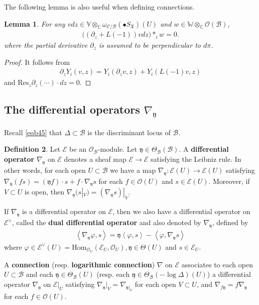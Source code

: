 \documentclass[11pt,b5paper,notitlepage]{article}
\theoremstyle{definition}
\newtheorem{df}{Definition}[section]
\theoremstyle{plain}
\newtheorem{lm}[df]{Lemma}
\newcommand{\mc}{\mathcal}
\newcommand{\Hom}{\mathrm{Hom}}
\newcommand{\Res}{\mathrm{Res}}
\newcommand{\scr}{\mathscr}
\newcommand{\yk}{\mathfrak y}
\newcommand{\blt}{\bullet}
\newcommand{\Vbb}{\mathbb V}
\newcommand{\Wbb}{\mathbb W}
\newcommand{\Cbb}{\mathbb C}
\newcommand{\<}{\left\langle}
\renewcommand{\>}{\right\rangle}
\newcommand{\MO}{\mathcal{O}}
\newcommand{\MC}{\mathcal{C}}
\newcommand{\MB}{\mathcal{B}}
\newcommand{\fx}{\mathfrak{X}}
\numberwithin{equation}{section}
\begin{document}
The following lemma is also useful when defining connections.
\begin{lm}\label{commutator777}
    For any $vdz\in \Vbb\otimes_\Cbb \omega_{\MC/\MB}(\blt S_\fx)(U)$ and $w\in \Wbb\otimes_\Cbb \MO(\MB)$, 
    \begin{align}
        \big((\partial_z+L(-1)) vdz\big)*_i w=0.
    \end{align}
where the partial derivative $\partial_z$ is assumed to be perpendicular to $d\pi$.
\end{lm}
\begin{proof}
    It follows from
    \begin{align*}
        \partial_z Y_i(v,z)=Y_i(\partial_z v,z)+Y_i(L(-1)v,z)
    \end{align*}
    and $\Res_z \partial_z(\cdots)\cdot dz=0$.
\end{proof}

\subsection{The differential operators $\nabla_\yk$}\label{lbb17}

Recall \eqref{eqb45} that $\Delta\subset\mc B$ is the discriminant locus of $\mc B$.

\begin{df}\label{lbb18}
Let $\scr E$ be an $\mc O_\MB$-module. Let $\yk\in\Theta_\MB(\mc B)$. A \textbf{differential operator} $\nabla_\yk$ on $\scr E$ denotes a sheaf map $\scr E\rightarrow\scr E$ satisfying the Leibniz rule. In other words, for each open $U\subset\mc B$ we have a map $\nabla_\yk:\scr E(U)\rightarrow\scr E(U)$ satisfying $\nabla_\yk(fs)=(\yk f)\cdot s+f\cdot \nabla_\yk s$ for each $f\in\mc O(U)$ and $s\in\scr E(U)$. Moreover, if $V\subset U$ is open, then $\nabla_\yk(s|_V)=(\nabla_\yk s)|_V$.

If $\nabla_\yk$ is a differential operator on $\scr E$, then we also have a differential operator on $\scr E^\vee$, called the \textbf{dual differential operator} and also denoted by $\nabla_\yk$, defined by
    \begin{align}\label{notation1}
        \<\nabla_\yk \varphi,s\>=\yk\<\varphi,s\>-\<\varphi,\nabla_\yk s\>
    \end{align}
    where $\varphi\in \scr E^\vee(U)=\Hom_{\MO_U}(\scr E_U,\MO_U),\yk\in \Theta(U)$ and $s\in \scr E_U$.  


A \textbf{connection} (resp. \textbf{logarithmic connection}) $\nabla$ on $\scr E$ associates to each open $U\subset\mc B$ and each $\yk\in\Theta_\MB(U)$ (resp. each $\yk\in\Theta_\MB(-\log\Delta)(U)$) a differential operator $\nabla_\yk$ on $\scr E|_U$ satisfying $\nabla_\yk|_V=\nabla_{\yk|_V}$ for each open $V\subset U$, and $\nabla_{f\yk}=f\nabla_\yk$ for each $f\in\mc O(U)$. \hfill\qedsymbol
\end{df}
\end{document}
